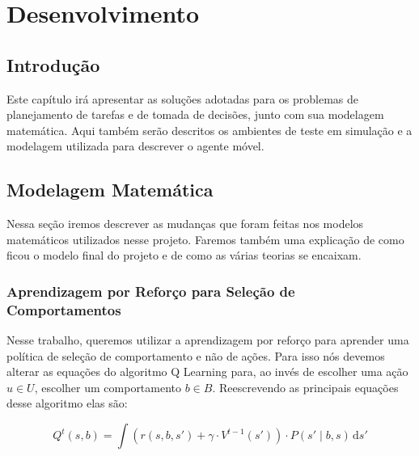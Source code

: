 


\chapter{Desenvolvimento\label{chap:Desenvolvimento}}


\section{Introdução}

Este capítulo irá apresentar as soluções adotadas para os problemas de planejamento de tarefas e de tomada de decisões, junto com sua modelagem matemática. Aqui também serão descritos os ambientes de teste em simulação e a modelagem utilizada para descrever o agente móvel.

\section{Modelagem Matemática}

Nessa seção iremos descrever as mudanças que foram feitas nos modelos matemáticos utilizados nesse projeto. Faremos também uma explicação de como ficou o modelo final do projeto e de como as várias teorias se encaixam.

\subsection{Aprendizagem por Reforço para Seleção de Comportamentos} \label{subsection:QLearningSelecaoDeComportamento}

Nesse trabalho, queremos utilizar a aprendizagem por reforço para aprender uma política de seleção de comportamento e não de ações. Para isso nós devemos alterar as equações do algoritmo Q Learning para, ao invés de escolher uma ação $ u \in U $, escolher um comportamento $ b \in B $. Reescrevendo as principais equações desse algoritmo elas são:

\begin{equation} \label{equation:QValueFunctionBehavior}
    Q^t \left( s, b \right) = \int \! \left( r \left( s, b, s' \right) + \gamma \cdot V^{t-1} \left( s' \right) \right) \cdot P \left( s' \mid b, s \right) \, \mathrm{d}s'
\end{equation}


